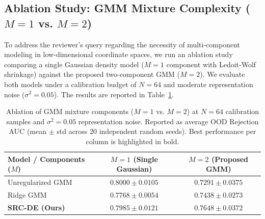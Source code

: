\subsection{Ablation Study: GMM Mixture Complexity ($M=1$ vs. $M=2$)}
\label{submission:sec:ablation_m}

To address the reviewer's query regarding the necessity of multi-component modeling in low-dimensional coordinate spaces, we run an ablation study comparing a single Gaussian density model ($M=1$ component with Ledoit-Wolf shrinkage) against the proposed two-component GMM ($M=2$). We evaluate both models under a calibration budget of $N=64$ and moderate representation noise ($\sigma^2=0.05$). The results are reported in Table~\ref{submission:tab:ablation_m}.

\begin{table}[h]
\caption{Ablation of GMM mixture components ($M=1$ vs. $M=2$) at $N=64$ calibration samples and $\sigma^2=0.05$ representation noise. Reported as average OOD Rejection AUC (mean $\pm$ std across 20 independent random seeds). Best performance per column is highlighted in bold.}
\label{submission:tab:ablation_m}
\vskip 0.15in
\begin{center}
\begin{small}
\begin{tabular}{lcc}
\toprule
Model / Components ($M$) & $M=1$ (Single Gaussian) & $M=2$ (Proposed GMM) \\
\midrule
Unregularized GMM & \bf $0.8000 \pm 0.0105$ & $0.7291 \pm 0.0375$ \\
Ridge GMM & $0.7768 \pm 0.0054$ & $0.7438 \pm 0.0273$ \\
\bf SRC-DE (Ours) & $0.7985 \pm 0.0121$ & \bf $0.7648 \pm 0.0372$ \\
\bottomrule
\end{tabular}
\end{small}
\end{center}
\vskip -0.1in
\end{table}

